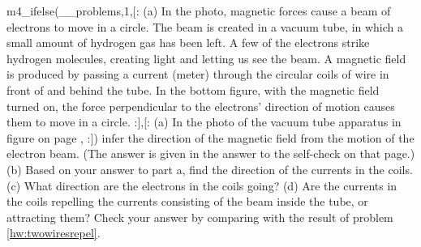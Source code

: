   m4_ifelse(__problems,1,[:%
        (a) In the photo,
              magnetic forces cause a beam of electrons to move in a circle.
              The beam is created in a vacuum tube, in which a small amount of
              hydrogen gas has been left. A few of the electrons strike hydrogen
              molecules, creating light and letting us see the beam. A magnetic
              field is produced by passing a current (meter) through the circular
              coils of wire in front of and behind the tube. In the bottom figure,
              with the magnetic field turned on, the force perpendicular to the
              electrons' direction of motion causes them to move in a circle.
:],[:%
        (a) In the photo of the vacuum tube apparatus in figure 
        on page \pageref{fig:circular-orbit},
:])%
        infer the direction of the magnetic field from
        the motion of the electron beam. (The answer is given in the answer to the self-check
        on that page.)\hwendpart
        (b) Based on your answer to part
        a, find the direction of the currents in the coils.\hwendpart
        (c) What
        direction are the electrons in the coils going? \hwendpart
        (d) Are the
        currents in the coils repelling the currents
        consisting of the beam inside the tube, or attracting them? Check your answer by comparing with
        the result of problem \ref{hw:twowiresrepel}.
